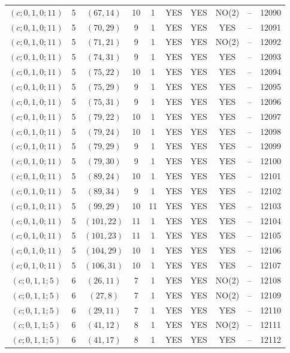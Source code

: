 \begin{longtable}{|c|c|c|c|c|c|c|c|c|c|}
$(c; 0, 1, 0; 11)$ & 5 & $(67, 14)$ & 10 & 1 & YES & YES & NO(2) & -- & 12090\\
$(c; 0, 1, 0; 11)$ & 5 & $(70, 29)$ & 9 & 1 & YES & YES & YES & -- & 12091\\
$(c; 0, 1, 0; 11)$ & 5 & $(71, 21)$ & 9 & 1 & YES & YES & NO(2) & -- & 12092\\
$(c; 0, 1, 0; 11)$ & 5 & $(74, 31)$ & 9 & 1 & YES & YES & YES & -- & 12093\\
$(c; 0, 1, 0; 11)$ & 5 & $(75, 22)$ & 10 & 1 & YES & YES & YES & -- & 12094\\
$(c; 0, 1, 0; 11)$ & 5 & $(75, 29)$ & 9 & 1 & YES & YES & YES & -- & 12095\\
$(c; 0, 1, 0; 11)$ & 5 & $(75, 31)$ & 9 & 1 & YES & YES & YES & -- & 12096\\
$(c; 0, 1, 0; 11)$ & 5 & $(79, 22)$ & 10 & 1 & YES & YES & YES & -- & 12097\\
$(c; 0, 1, 0; 11)$ & 5 & $(79, 24)$ & 10 & 1 & YES & YES & YES & -- & 12098\\
$(c; 0, 1, 0; 11)$ & 5 & $(79, 29)$ & 9 & 1 & YES & YES & YES & -- & 12099\\
$(c; 0, 1, 0; 11)$ & 5 & $(79, 30)$ & 9 & 1 & YES & YES & YES & -- & 12100\\
$(c; 0, 1, 0; 11)$ & 5 & $(89, 24)$ & 10 & 1 & YES & YES & YES & -- & 12101\\
$(c; 0, 1, 0; 11)$ & 5 & $(89, 34)$ & 9 & 1 & YES & YES & YES & -- & 12102\\
$(c; 0, 1, 0; 11)$ & 5 & $(99, 29)$ & 10 & 11 & YES & YES & YES & -- & 12103\\
$(c; 0, 1, 0; 11)$ & 5 & $(101, 22)$ & 11 & 1 & YES & YES & YES & -- & 12104\\
$(c; 0, 1, 0; 11)$ & 5 & $(101, 23)$ & 11 & 1 & YES & YES & YES & -- & 12105\\
$(c; 0, 1, 0; 11)$ & 5 & $(104, 29)$ & 10 & 1 & YES & YES & YES & -- & 12106\\
$(c; 0, 1, 0; 11)$ & 5 & $(106, 31)$ & 10 & 1 & YES & YES & YES & -- & 12107\\
$(c; 0, 1, 1; 5)$ & 6 & $(26, 11)$ & 7 & 1 & YES & YES & NO(2) & -- & 12108\\
$(c; 0, 1, 1; 5)$ & 6 & $(27, 8)$ & 7 & 1 & YES & YES & NO(2) & -- & 12109\\
$(c; 0, 1, 1; 5)$ & 6 & $(29, 11)$ & 7 & 1 & YES & YES & YES & -- & 12110\\
$(c; 0, 1, 1; 5)$ & 6 & $(41, 12)$ & 8 & 1 & YES & YES & NO(2) & -- & 12111\\
$(c; 0, 1, 1; 5)$ & 6 & $(41, 17)$ & 8 & 1 & YES & YES & YES & -- & 12112\\

\end{longtable}

